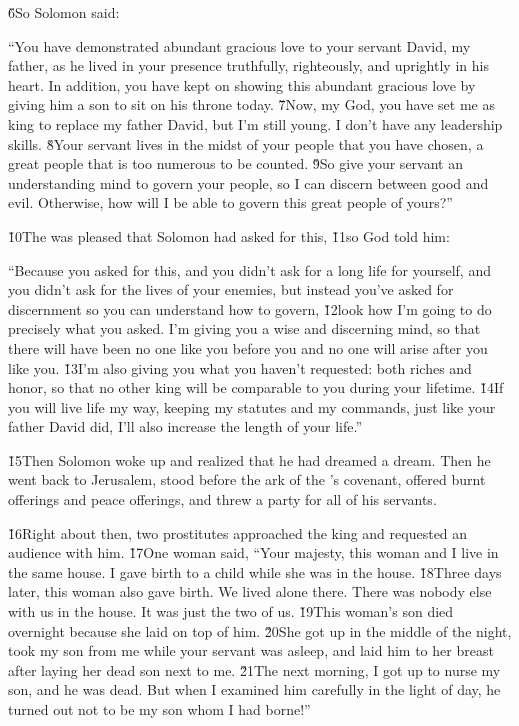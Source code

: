 \v{6}So Solomon said:

\begin{poetry}
\poeml ``You have demonstrated abundant gracious love to your servant David, my father, as he lived in your presence truthfully, righteously, and uprightly in his heart. In addition, you have kept on showing this abundant gracious love by giving him a son to sit on his throne today. \v{7}Now,  my God, you have set me as king to replace my father David, but I'm still young. I don't have any leadership skills. \v{8}Your servant lives in the midst of your people that you have chosen, a great people that is too numerous to be counted. \v{9}So give your servant an understanding mind to govern your people, so I can discern between good and evil. Otherwise, how will I be able to govern this great people of yours?''
\end{poetry}

\v{10}The  was pleased that Solomon had asked for this, \v{11}so God told him:

\begin{poetry}
\poeml ``Because you asked for this, and you didn't ask for a long life for yourself, and you didn't ask for the lives of your enemies, but instead you've asked for discernment so you can understand how to govern, \v{12}look how I'm going to do precisely what you asked. I'm giving you a wise and discerning mind, so that there will have been no one like you before you and no one will arise after you like you. \v{13}I'm also giving you what you haven't requested: both riches and honor, so that no other king will be comparable to you during your lifetime. \v{14}If you will live life my way, keeping my statutes and my commands, just like your father David did, I'll also increase the length of your life.''
\end{poetry}

\v{15}Then Solomon woke up and realized that he had dreamed a dream. Then he went back to Jerusalem, stood before the ark of the 's covenant, offered burnt offerings and peace offerings, and threw a party for all of his servants.

\v{16}Right about then, two prostitutes approached the king and requested an audience with him. \v{17}One woman said, ``Your majesty, this woman and I live in the same house. I gave birth to a child while she was in the house. \v{18}Three days later, this woman also gave birth. We lived alone there. There was nobody else with us in the house. It was just the two of us. \v{19}This woman's son died overnight because she laid on top of him. \v{20}She got up in the middle of the night, took my son from me while your servant was asleep, and laid him to her breast after laying her dead son next to me. \v{21}The next morning, I got up to nurse my son, and he was dead. But when I examined him carefully in the light of day, he turned out not to be my son whom I had borne!''

